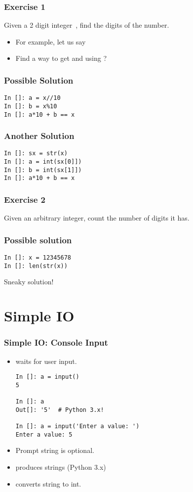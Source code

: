 \documentclass[14pt,compress]{beamer}
\begin{document}
\begin{frame}
  \frametitle{Exercise 1}
  Given a 2 digit integer\ , find the digits of the number.
  \vspace*{1em}

  \begin{itemize}
  \item For example, let us say 
  \item Find a way to get  and  using ?
  \end{itemize}

\end{frame}

\begin{frame}[fragile]
  \frametitle{Possible Solution}
\begin{lstlisting}
In []: a = x//10
In []: b = x%10
In []: a*10 + b == x
\end{lstlisting}
\end{frame}

\begin{frame}[fragile]
  \frametitle{Another Solution}
\begin{lstlisting}
In []: sx = str(x)
In []: a = int(sx[0]])
In []: b = int(sx[1]])
In []: a*10 + b == x
\end{lstlisting}
\end{frame}


\begin{frame}
  \frametitle{Exercise 2}
  Given an arbitrary integer, count the number of digits it has.
\end{frame}

\begin{frame}[fragile]
\frametitle{Possible solution}
\begin{lstlisting}
In []: x = 12345678
In []: len(str(x))
\end{lstlisting}

  Sneaky solution!
\end{frame}



\section{Simple IO}
\begin{frame}[fragile]
  \frametitle{Simple IO: Console Input}
  \small
  \begin{itemize}
    \item {} waits for user input.
      \begin{lstlisting}
In []: a = input()
5

In []: a
Out[]: '5'  # Python 3.x!

In []: a = input('Enter a value: ')
Enter a value: 5
      \end{lstlisting}
    \item Prompt string is optional.
    \item {} produces strings (Python 3.x)
    \item {} converts string to int.
  \end{itemize}
\end{frame}
\end{document}

